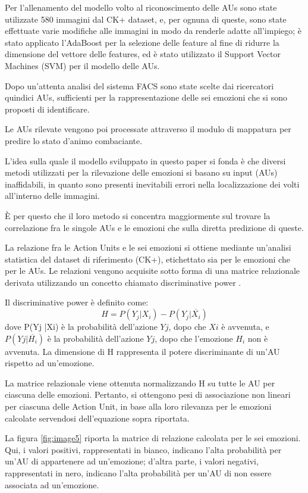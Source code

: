 Per l’allenamento del modello volto al riconoscimento delle AUs sono state utilizzate 580 immagini dal CK+ dataset, e, per ognuna di queste, sono state effettuate varie modifiche alle immagini in modo da renderle adatte all’impiego; è stato applicato l’AdaBoost per la selezione delle feature al fine di ridurre la dimensione del vettore delle features, ed è stato utilizzato il Support Vector Machines (SVM) per il modello delle AUs.

Dopo un’attenta analisi del sistema FACS sono state scelte dai ricercatori quindici AUs, sufficienti per la rappresentazione delle sei emozioni che si sono proposti di identificare.

Le AUs rilevate vengono poi processate attraverso il modulo di mappatura per predire lo stato d’animo combaciante.

L’idea sulla quale il modello sviluppato in questo paper si fonda è che diversi metodi utilizzati per la rilevazione delle emozioni si basano su input (AUs) inaffidabili, in quanto sono presenti inevitabili errori nella localizzazione dei volti all’interno delle immagini.

È per questo che il loro metodo si concentra maggiormente sul trovare la correlazione fra le singole AUs e le emozioni che sulla diretta predizione di queste.

La relazione fra le Action Units e le sei emozioni si ottiene mediante un'analisi statistica del dataset di riferimento (CK+), etichettato sia per le emozioni che per le AUs. Le relazioni vengono acquisite sotto forma di una matrice relazionale derivata utilizzando un concetto chiamato discriminative power \cite{AutoInfereComplMentStatesVid}. 

Il discriminative power è definito come:
\[
H = P(Y_j|X_i) - P(Y_j|\overline{X_i})
\]
dove P(Yj |Xi) è la probabilità dell'azione $Yj$, dopo che $Xi$ è avvenuta, e $P(Yj | \overline{H_i})$ è la probabilità dell'azione $Yj$, dopo che l'emozione $H_i$ non è avvenuta. La dimensione di H rappresenta il potere discriminante di un'AU rispetto ad un'emozione.

La matrice relazionale viene ottenuta normalizzando H su tutte le AU per ciascuna delle emozioni. Pertanto, si ottengono pesi di associazione non lineari per ciascuna delle Action Unit, in base alla loro rilevanza per le emozioni calcolate servendosi dell'equazione sopra riportata.

La figura \ref{fig:image5} riporta la matrice di relazione calcolata per le sei emozioni. Qui, i valori positivi, rappresentati in bianco, indicano l'alta probabilità per un'AU di appartenere ad un'emozione; d’altra parte, i valori negativi, rappresentati in nero, indicano l'alta probabilità per un'AU di non essere associata ad un'emozione. 

